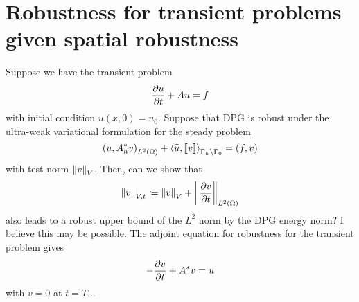 \documentclass{article}
\begin{document}
\section{Robustness for transient problems given spatial robustness}

Suppose we have the transient problem
\[
\frac{\partial u}{\partial t} + Au = f
\]
with initial condition $u(x,0) = u_0$.  Suppose that DPG is robust under the ultra-weak variational formulation for the steady problem
\[
\left( u,A^*_h v \right)_{L^2\left( \Omega \right)} + \left\langle \widehat{u}, \left[ \![v]\! \right] \right\rangle_{\Gamma_h\setminus \Gamma_0} = \left( f,v \right)
\]
with test norm $\left\| v \right\|_{V}$.  Then, can we show that 
\[
\left\| v \right\|_{V,t} \coloneqq \left\| v \right\|_V + \left\| \frac{\partial v}{\partial t} \right\|_{L^2\left( \Omega \right)}
\]
also leads to a robust upper bound of the $L^2$ norm by the DPG energy norm?  I believe this may be possible.  The adjoint equation for robustness for the transient problem gives
\[
-\frac{\partial v}{\partial t} + A^*v = u
\]
with $v = 0$ at $t=T$...  
\end{document}
